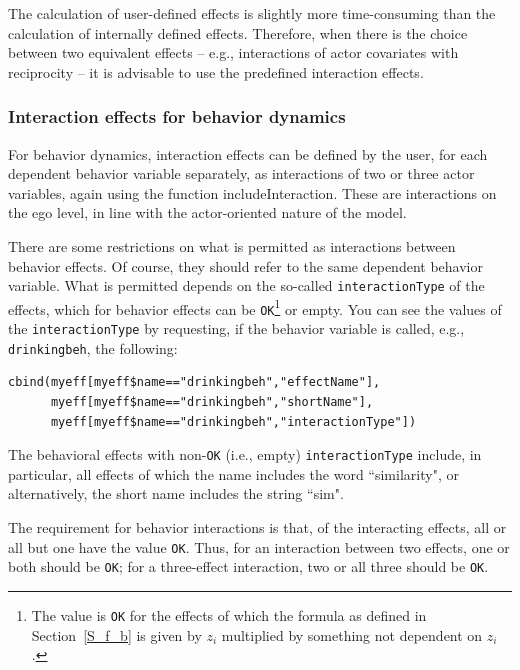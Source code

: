 \documentclass[a4paper,fleqn,11pt]{article}
\newcommand{\+}{\, + \,}
\begin{document}
{The calculation of user-defined effects is slightly more time-consuming
than the calculation of internally defined effects. Therefore, when there
is the choice between two equivalent effects -- e.g., interactions
of actor covariates with reciprocity -- it is advisable to use
the predefined interaction effects.
\fi

\subsubsection{Interaction effects for behavior dynamics}
\label{S_beh_infl}

For behavior dynamics, interaction effects can be defined
by the user, for each dependent behavior variable separately,
as interactions of two or three actor variables,
again using the function \textsf{includeInteraction}.
These are interactions on the ego level, in line with the
actor-oriented nature of the model.

There are some restrictions on what is permitted
as interactions between behavior effects.
Of course,  they should refer to the same dependent behavior variable.
What is permitted depends on the so-called \texttt{interactionType} of the
effects, which for behavior effects can be \texttt{OK}\footnote{The value
is \texttt{OK} for the effects of which the
formula as defined in Section~\ref{S_f_b}
is given by $z_i$ multiplied by something not dependent on $z_i$.}
or empty.
You can see the values of the \texttt{interactionType} by requesting,
if the behavior variable is called, e.g., \texttt{drinkingbeh}, the following:
\begin{verbatim}
cbind(myeff[myeff$name=="drinkingbeh","effectName"],
      myeff[myeff$name=="drinkingbeh","shortName"],
      myeff[myeff$name=="drinkingbeh","interactionType"])
\end{verbatim}
The behavioral effects with non-\texttt{OK} (i.e., empty)
\texttt{interactionType} include,
in particular, all effects of which the name
includes the word ``similarity",
or alternatively, the short name includes the string ``sim".

The requirement for behavior interactions is that,
of the interacting effects, all or all but one have
the value \texttt{OK}. Thus, for an interaction between two effects,
one or both should be \texttt{OK}; for a three-effect interaction,
two or all three should be \texttt{OK}.

}
\end{document}
